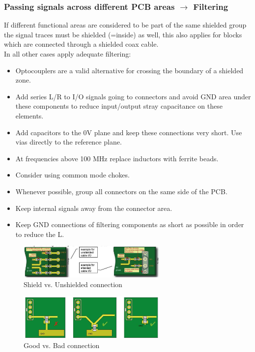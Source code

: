 		\subsubsection{Passing signals across different PCB areas $\rightarrow$ Filtering}
		If different functional areas are considered to be part of the same shielded group the signal traces must be shielded (=inside) as well, this also applies for blocks which are connected through a shielded coax cable. \\
		In all other cases apply adequate filtering:
		\begin{itemize}
			\item Optocouplers are a valid alternative for crossing the boundary of a shielded zone.
			\item Add series L/R to I/O signals going to connectors and avoid GND area under these components to reduce input/output stray capacitance on these elements. 
			\item Add capacitors to the 0V plane and keep these connections very short. Use vias directly to the reference plane. 
			\item At frequencies above 100 MHz replace inductors with ferrite beads. 
			\item Consider using common mode chokes. 
			\item Whenever possible, group all connectors on the same side of the PCB. 
			\item Keep internal signals away from the connector area. 
			\item Keep GND connections of filtering components as short as possible in order to reduce the L. 
		\end{itemize}
		\begin{figure}[h!]
			\centering
			\includegraphics[width=0.65\textwidth]{images/ShieldUnshieldedIO.png}
			\caption{Shield vs. Unshielded connection}
			\label{Fig:ShieldvsUnshielded}
		\end{figure}
		\begin{figure}[h!]
			\centering
			\includegraphics[width=0.65\textwidth]{images/GoodBadConnection.png}
			\caption{Good vs. Bad connection}
			\label{Fig:GoodvsBad}
		\end{figure}
